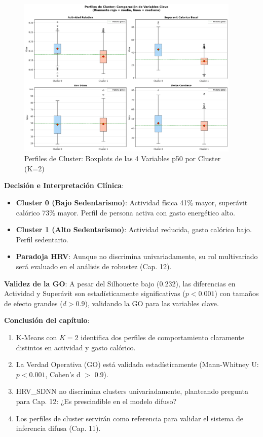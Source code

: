 \documentclass[12pt,letterpaper,twoside]{report}
\begin{document}
\begin{figure}[H]
\centering
\includegraphics[width=0.95\textwidth]{figuras/cluster_profiles_boxplots.png}
\caption{Perfiles de Cluster: Boxplots de las 4 Variables p50 por Cluster (K=2)}
\label{fig:cluster_profiles}
\end{figure}

\begin{decisionbox}
\textbf{Decisión e Interpretación Clínica}:

\begin{itemize}[noitemsep]
    \item \textbf{Cluster 0 (Bajo Sedentarismo)}: Actividad física 41\% mayor, superávit calórico 73\% mayor. Perfil de persona activa con gasto energético alto.
    \item \textbf{Cluster 1 (Alto Sedentarismo)}: Actividad reducida, gasto calórico bajo. Perfil sedentario.
    \item \textbf{Paradoja HRV}: Aunque no discrimina univariadamente, su rol multivariado será evaluado en el análisis de robustez (Cap. 12).
\end{itemize}

\textbf{Validez de la GO}: A pesar del Silhouette bajo (0.232), las diferencias en Actividad y Superávit son estadísticamente significativas ($p<0.001$) con tamaños de efecto grandes ($d>0.9$), validando la GO para las variables clave.
\end{decisionbox}

\begin{conclusionbox}
\textbf{Conclusión del capítulo}:

\begin{enumerate}[noitemsep]
    \item K-Means con $K=2$ identifica dos perfiles de comportamiento claramente distintos en actividad y gasto calórico.
    \item La Verdad Operativa (GO) está validada estadísticamente (Mann-Whitney U: $p<0.001$, Cohen's d $>$ 0.9).
    \item HRV\_SDNN no discrimina clusters univariadamente, planteando pregunta para Cap. 12: ¿Es prescindible en el modelo difuso?
    \item Los perfiles de cluster servirán como referencia para validar el sistema de inferencia difusa (Cap. 11).
\end{enumerate}
\end{conclusionbox}
\end{document}
